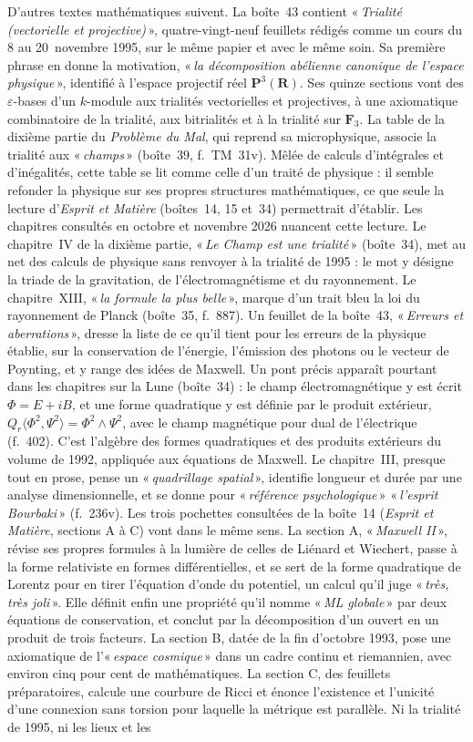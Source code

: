 \documentclass[11pt]{amsart}
\newcommand{\q}[1]{«\,\textit{#1}\,»}
\begin{document}
D'autres textes mathématiques suivent. La boîte~43 contient \q{Trialité (vectorielle et projective)}, quatre-vingt-neuf feuillets rédigés comme un cours du 8 au 20~novembre 1995, sur le même papier et avec le même soin. Sa première phrase en donne la motivation, \q{la décomposition abélienne canonique de l'espace physique}, identifié à l'espace projectif réel $\mathbf P^3(\mathbf R)$. Ses quinze sections vont des $\varepsilon$-bases d'un $k$-module aux trialités vectorielles et projectives, à une axiomatique combinatoire de la trialité, aux bitrialités et à la trialité sur $\mathbf F_3$. La table de la dixième partie du \emph{Problème du Mal}, qui reprend sa microphysique, associe la trialité aux \q{champs} (boîte~39, f.~TM~31v). Mêlée de calculs d'intégrales et d'inégalités, cette table se lit comme celle d'un traité de physique : il semble refonder la physique sur ses propres structures mathématiques, ce que seule la lecture d'\emph{Esprit et Matière} (boîtes~14, 15 et~34) permettrait d'établir. Les chapitres consultés en octobre et novembre 2026 nuancent cette lecture. Le chapitre~IV de la dixième partie, \q{Le Champ est une trialité} (boîte~34), met au net des calculs de physique sans renvoyer à la trialité de 1995 : le mot y désigne la triade de la gravitation, de l'électromagnétisme et du rayonnement. Le chapitre~XIII, \q{la formule la plus belle}, marque d'un trait bleu la loi du rayonnement de Planck (boîte~35, f.~887). Un feuillet de la boîte~43, \q{Erreurs et aberrations}, dresse la liste de ce qu'il tient pour les erreurs de la physique établie, sur la conservation de l'énergie, l'émission des photons ou le vecteur de Poynting, et y range des idées de Maxwell. Un pont précis apparaît pourtant dans les chapitres sur la Lune (boîte~34) : le champ électromagnétique y est écrit $\Phi = E + iB$, et une forme quadratique y est définie par le produit extérieur, $Q_r\langle \Phi^2, \Psi^2 \rangle = \Phi^2 \wedge \Psi^2$, avec le champ magnétique pour dual de l'électrique (f.~402). C'est l'algèbre des formes quadratiques et des produits extérieurs du volume de 1992, appliquée aux équations de Maxwell. Le chapitre~III, presque tout en prose, pense un \q{quadrillage spatial}, identifie longueur et durée par une analyse dimensionnelle, et se donne pour \q{référence psychologique} \q{l'esprit Bourbaki} (f.~236v). Les trois pochettes consultées de la boîte~14 (\emph{Esprit et Matière}, sections A à C) vont dans le même sens. La section A, \q{Maxwell II}, révise ses propres formules à la lumière de celles de Liénard et Wiechert, passe à la forme relativiste en formes différentielles, et se sert de la forme quadratique de Lorentz pour en tirer l'équation d'onde du potentiel, un calcul qu'il juge \q{très, très joli}. Elle définit enfin une propriété qu'il nomme \q{ML globale} par deux équations de conservation, et conclut par la décomposition d'un ouvert en un produit de trois facteurs. La section B, datée de la fin d'octobre 1993, pose une axiomatique de l'\q{espace cosmique} dans un cadre continu et riemannien, avec environ cinq pour cent de mathématiques. La section C, des feuillets préparatoires, calcule une courbure de Ricci et énonce l'existence et l'unicité d'une connexion sans torsion pour laquelle la métrique est parallèle. Ni la trialité de 1995, ni les lieux et les 
\end{document}
